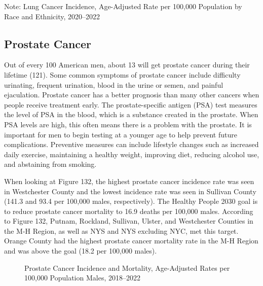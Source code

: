 \documentclass[
  english,
  letterpaper,
]{report}
\begin{document}
\begin{tcolorbox}[enhanced jigsaw, breakable, leftrule=.75mm, title=\textcolor{quarto-callout-note-color}{\faInfo}\hspace{0.5em}{Note}, bottomrule=.15mm, opacityback=0, left=2mm, colback=white, bottomtitle=1mm, coltitle=black, colbacktitle=quarto-callout-note-color!10!white, colframe=quarto-callout-note-color-frame, opacitybacktitle=0.6, toptitle=1mm, titlerule=0mm, arc=.35mm, rightrule=.15mm, toprule=.15mm]

Note: Lung Cancer Incidence, Age-Adjusted Rate per 100,000 Population by
Race and Ethnicity, 2020--2022

\end{tcolorbox}

\subsection{Prostate Cancer}\label{prostate-cancer}

Out of every 100 American men, about 13 will get prostate cancer during
their lifetime (121). Some common symptoms of prostate cancer include
difficulty urinating, frequent urination, blood in the urine or semen,
and painful ejaculation. Prostate cancer has a better prognosis than
many other cancers when people receive treatment early. The
prostate-specific antigen (PSA) test measures the level of PSA in the
blood, which is a substance created in the prostate. When PSA levels are
high, this often means there is a problem with the prostate. It is
important for men to begin testing at a younger age to help prevent
future complications. Preventive measures can include lifestyle changes
such as increased daily exercise, maintaining a healthy weight,
improving diet, reducing alcohol use, and abstaining from smoking.

When looking at Figure 132, the highest prostate cancer incidence rate
was seen in Westchester County and the lowest incidence rate was seen in
Sullivan County (141.3 and 93.4 per 100,000 males, respectively). The
Healthy People 2030 goal is to reduce prostate cancer mortality to 16.9
deaths per 100,000 males. According to Figure 132, Putnam, Rockland,
Sullivan, Ulster, and Westchester Counties in the M-H Region, as well as
NYS and NYS excluding NYC, met this target. Orange County had the
highest prostate cancer mortality rate in the M-H Region and was above
the goal (18.2 per 100,000 males).

\begin{figure}


\caption{\label{fig-male-prostateca-incidence-mortal-aar}Prostate Cancer
Incidence and Mortality, Age-Adjusted Rates per 100,000 Population
Males, 2018--2022}

\end{figure}%
\end{document}
